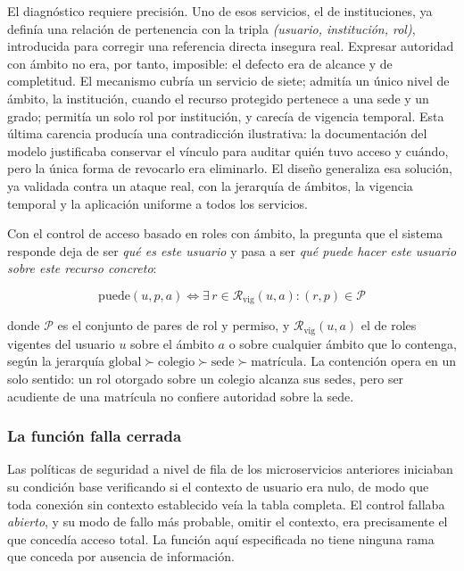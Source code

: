 El diagnóstico requiere precisión. Uno de esos servicios, el de instituciones, ya definía
una relación de pertenencia con la tripla \emph{(usuario, institución, rol)}, introducida
para corregir una referencia directa insegura real. Expresar autoridad con ámbito no era,
por tanto, imposible: el defecto era de alcance y de completitud. El mecanismo cubría un
servicio de siete; admitía un único nivel de ámbito, la institución, cuando el recurso
protegido pertenece a una sede y un grado; permitía un solo rol por institución, y carecía
de vigencia temporal. Esta última carencia producía una contradicción ilustrativa: la
documentación del modelo justificaba conservar el vínculo para auditar quién tuvo acceso y
cuándo, pero la única forma de revocarlo era eliminarlo. El diseño generaliza esa solución,
ya validada contra un ataque real, con la jerarquía de ámbitos, la vigencia temporal y la
aplicación uniforme a todos los servicios.

Con el control de acceso basado en roles con ámbito, la pregunta que el sistema responde
deja de ser \emph{qué es este usuario} y pasa a ser \emph{qué puede hacer este usuario sobre
este recurso concreto}:

\begin{equation}
\mathrm{puede}(u, p, a) \iff \exists\, r \in \mathcal{R}_{\text{vig}}(u, a) : (r, p) \in \mathcal{P}
\end{equation}

\noindent donde $\mathcal{P}$ es el conjunto de pares de rol y permiso, y
$\mathcal{R}_{\text{vig}}(u, a)$ el de roles vigentes del usuario $u$ sobre el ámbito $a$ o
sobre cualquier ámbito que lo contenga, según la jerarquía
$\text{global} \succ \text{colegio} \succ \text{sede} \succ \text{matrícula}$. La contención
opera en un solo sentido: un rol otorgado sobre un colegio alcanza sus sedes, pero ser
acudiente de una matrícula no confiere autoridad sobre la sede.

\subsubsection{La función falla cerrada}

Las políticas de seguridad a nivel de fila de los microservicios anteriores iniciaban su
condición base verificando si el contexto de usuario era nulo, de modo que toda conexión sin
contexto establecido veía la tabla completa. El control fallaba \emph{abierto}, y su modo de
fallo más probable, omitir el contexto, era precisamente el que concedía acceso total. La
función aquí especificada no tiene ninguna rama que conceda por ausencia de información.

